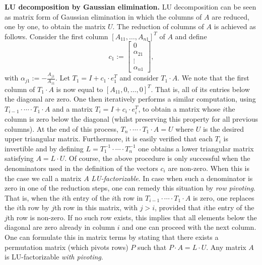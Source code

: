 \smallskip
\noindent
\textbf{LU decomposition by Gaussian elimination.} LU decomposition can be seen as matrix form of Gaussian elimination in which the columns of $A$
are reduced, one by one, to obtain the matrix $U$. The reduction of columns of $A$ is achieved
as follows. Consider the first column $[A_{11},\ldots,A_{n1}]^T$ of $A$ and  define 
\[
c_1 :=
\begin{bmatrix}
    0 \\
    \alpha_{21} \\
    \vdots \\
    \alpha_{n1}
\end{bmatrix},
\]
with $\alpha_{j1} := -\frac{A_{j1}}{A_{11}}$. Let $T_1=I+ c_1\cdot e_1^T$ and consider
$T_1\cdot A$. We note that the first column of $T_1\cdot A$ is now equal to $[A_{11},0,\ldots,0]^T$. That is,
all of its entries below the diagonal are zero. One then iteratively performs a similar computation, using $T_{i-1}\cdot\cdots\cdot T_1\cdot A$ and a matrix $T_i=I+c_i\cdot e_i^T$, to obtain a matrix whose $i$the column is zero below the diagonal (whilst preserving this property for all previous columns). At the end of this process, $T_n\cdot\cdots\cdot T_1\cdot A=U$ where $U$ is the desired upper triangular matrix.
Furthermore, it is easily verified that each $T_i$ is invertible and by defining $L=T_1^{-1}\cdot\cdots\cdot T_n^{-1}$ one obtains a lower triangular matrix satisfying $A=L\cdot U$. Of course, the above procedure is only successful when the denominators used in the definition of the vectors $c_i$ are non-zero. When this is the case we call a matrix $A$ \textit{LU-factorizable}. In case when such a denominator is zero in one of the reduction steps, one can remedy this situation by \textit{row pivoting}. That is, when the $i$th entry of the
$i$th row in $T_{i-1}\cdot\cdots\cdot T_1\cdot A$ is zero, one replaces the $i$th row by  $j$th row in this matrix, with $j>i$, provided that $i$the entry of the $j$th row is non-zero. If no such row exists, this implies that all elements below the diagonal are zero already in column $i$ and one can proceed with the next column. One can formulate this in matrix terms by stating that there exists a permutation matrix (which pivots rows) $P$ such that $P\cdot A=L\cdot U$. Any matrix $A$ is LU-factorizable \textit{with pivoting}.
 
